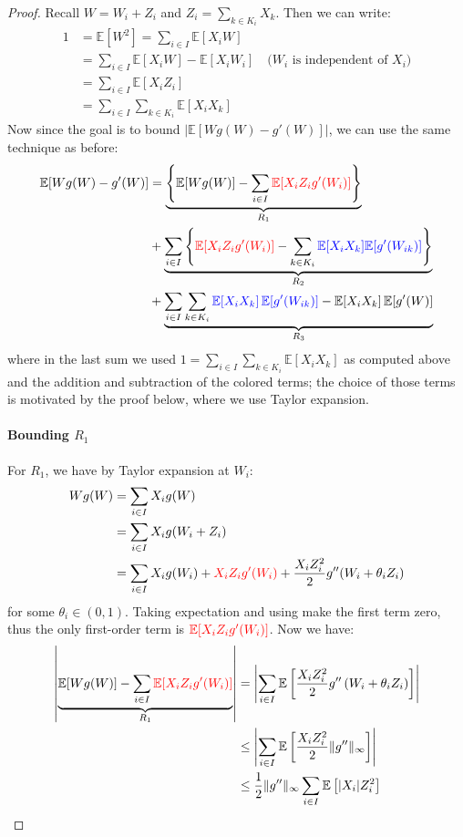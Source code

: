 \documentclass{article}
\begin{document}
\begin{proof}
    Recall $W = W_i + Z_i$ and $Z_i = \sum_{k\in K_i} X_k$. Then we can write:
    \begin{align*}
        1 &= \mathbb{E}[W^2] = \sum_{i\in I} \mathbb{E}[X_i W] \\
        &= \sum_{i\in I} \mathbb{E}[X_i W] - \mathbb{E}[X_i W_i] \quad \text{($W_i$ is independent of $X_i$)}
         \\
        &= \sum_{i\in I} \mathbb{E}[X_i Z_i] \\
        &= \sum_{i\in I}\sum_{k\in K_i} \mathbb{E}[X_i X_k]
    \end{align*}
    Now since the goal is to bound $|\mathbb{E}[Wg(W)-g'(W)]|$, we can use the same technique as before:
    \begin{align*}
        \mathbb{E}[Wg(W)-g'(W)] &= \underbrace{\left\{\mathbb{E}[W g(W)]-\sum_{i\in I}\textcolor{red}{\mathbb{E}[X_{i}Z_{i}g^{\prime}(W_{i})]}\right\}}_{R_1} \\
        &+\underbrace{\sum_{i\in I}\left\{\textcolor{red}{{\mathbb{E}}[X_{i}Z_{i}g^{\prime}(W_{i})]}-\sum_{k\in K_{i}}\textcolor{blue}{{\mathbb{E}}[X_{i}X_{k}]{\mathbb{E}}[g^{\prime}(W_{i k})]}\right\}}_{R_2}\\
        &+\underbrace{\sum_{i\in I}\sum_{k\in K_{i}}\textcolor{blue}{\mathbb{E}[X_{i}X_{k}]\operatorname{\mathbb{E}}[g^{\prime}(W_{i k})]}-\mathbb{E}[X_{i}X_{k}]\operatorname{\mathbb{E}}[g^{\prime}(W)]}_{R_3}
    \end{align*}
    where in the last sum we used $1=\sum_{i\in I}\sum_{k\in K_i} \mathbb{E}[X_i X_k]$ as computed above and the addition and subtraction of the colored terms; the choice of those terms is motivated by the proof below, where we use Taylor expansion.

\paragraph{Bounding $R_1$} For $R_1$, we have by Taylor expansion at $W_i$:
\begin{align*}
    Wg(W) &= \sum_{i\in I} X_i g(W)\\
    &= \sum_{i\in I} X_i g(W_i + Z_i)\\
    &= \sum_{i\in I} X_i g(W_i) + \textcolor{red}{X_i Z_i g'(W_i)} + \frac{X_i Z_i^2}{2} g''(W_i + \theta_i Z_i)
\end{align*}
for some $\theta_i \in (0,1)$. Taking expectation and using  make the first term zero, thus the only first-order term is $\textcolor{red}{\mathbb{E}[X_i Z_i g'(W_i)]}$. Now we have:
\begin{align*}
    \left|\underbrace{\mathbb{E}[W g(W)]-\sum_{i\in I}\textcolor{red}{\mathbb{E}[X_{i}Z_{i}g^{\prime}(W_{i})]}}_{R_1} \right| &= \left|\sum_{i\in I}\mathbb{E}\left[\frac{X_{i}Z_{i}^{2}}{2}g^{\prime \prime}\left(W_{i}+\theta_{i} Z_{i}\right)\right]\right|\\
    &\leq \left|\sum_{i\in I}\mathbb{E}\left[\frac{X_{i}Z_{i}^{2}}{2}\|g^{\prime \prime}\|_{\infty}\right]\right|\\
    &\leq\frac{1}{2} \|g^{\prime \prime}\|_{\infty} \sum_{i\in I}\mathbb{E}\left[|X_{i}| Z_{i}^{2}\right]
\end{align*}  


\end{proof}
\end{document}
